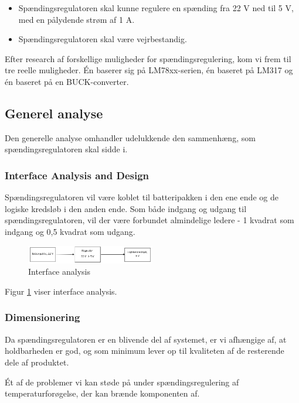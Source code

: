 \begin{itemize}
\item Spændingsregulatoren skal kunne regulere en spænding fra 22 V ned til 5 V, med en pålydende strøm af 1 A. 
\item Spændingsregulatoren skal være vejrbestandig.
\end{itemize}

Efter research af forskellige muligheder for spændingsregulering, kom vi frem til tre reelle muligheder. Én baserer sig på LM78xx-serien, én baseret på LM317 og én baseret på en BUCK-converter.

\subsection{Generel analyse}
\label{sec:generel-analyse-}

Den generelle analyse omhandler udelukkende den sammenhæng, som spændingsregulatoren skal sidde i.

\subsubsection{Interface Analysis and Design}
\label{sec:generel-analyse}

Spændingsregulatoren vil være koblet til batteripakken i den ene ende og de logiske kredsløb i den anden ende. Som både indgang og udgang til spændingsregulatoren, vil der være forbundet almindelige ledere - 1 kvadrat som indgang og 0,5 kvadrat som udgang.

\begin{figure}[h]
  \centering
  \includegraphics[width=0.5\textwidth]{./figurer/j1.png}
  \caption{Interface analysis}
  \label{fig:j1}
\end{figure}

Figur \ref{fig:j1} viser interface analysis.

\subsubsection{Dimensionering}
\label{sec:generel-analyse-1}

Da spændingsregulatoren er en blivende del af systemet, er vi afhængige af, at holdbarheden er god, og som minimum lever op til kvaliteten af de resterende dele af produktet.

Ét af de problemer vi kan støde på under spændingsregulering af temperaturforøgelse, der kan brænde komponenten af.


